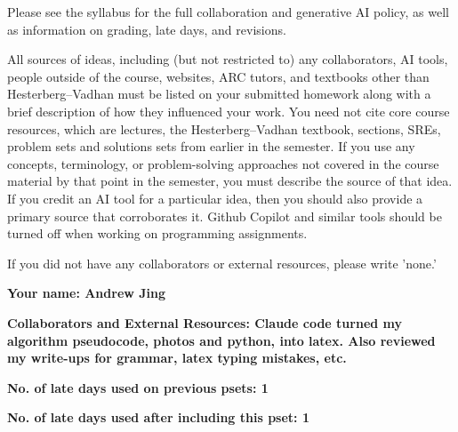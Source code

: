 \documentclass[11pt]{article}
\begin{document}

Please see the syllabus for the full collaboration and generative AI policy, as well as information on grading, late days, and revisions.

All sources of ideas, including (but not restricted to) any collaborators, AI tools, people outside of the course, websites, ARC tutors, and textbooks other than Hesterberg--Vadhan must be listed on your submitted homework along with a brief description of how they influenced your work. You need not cite core course resources, which are lectures, the Hesterberg--Vadhan textbook, sections, SREs, problem sets and solutions sets from earlier in the semester. If you use any concepts, terminology, or problem-solving approaches not covered in the course material by that point in the semester, you must describe the source of that idea. If you credit an AI tool for a particular idea, then you should also provide a primary source that corroborates it. Github Copilot and similar tools should be turned off when working on programming assignments.

If you did not have any collaborators or external resources, please write 'none.' 
\newline

\textbf{Your name: Andrew Jing}

\textbf{Collaborators and External Resources: Claude code turned my algorithm pseudocode, photos and python, into latex. Also reviewed my write-ups for grammar, latex typing mistakes, etc.}

\textbf{No. of late days used on previous psets: 1}

\textbf{No. of late days used after including this pset: 1}

\vspace{1em}

\newpage
\end{document}
